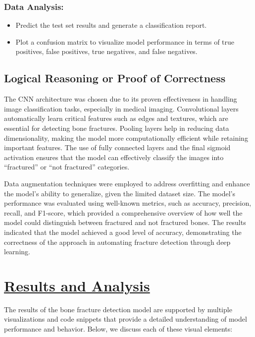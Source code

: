 \documentclass[11pt]{article}
\providecommand{\tightlist}{%
      \setlength{\itemsep}{0pt}\setlength{\parskip}{0pt}}
\begin{document}
\subsubsection*{Data Analysis:}\label{data-analysis}

\begin{itemize}
\tightlist
\item
  Predict the test set results and generate a classification report.
\item
  Plot a confusion matrix to visualize model performance in terms of
  true positives, false positives, true negatives, and false negatives.
\end{itemize}

\subsection*{ Logical Reasoning or Proof of
Correctness}\label{logical-reasoning-or-proof-of-correctness}

The CNN architecture was chosen due to its proven effectiveness in
handling image classification tasks, especially in medical imaging.
Convolutional layers automatically learn critical features such as edges
and textures, which are essential for detecting bone fractures. Pooling
layers help in reducing data dimensionality, making the model more
computationally efficient while retaining important features. The use of
fully connected layers and the final sigmoid activation ensures that the
model can effectively classify the images into ``fractured'' or ``not
fractured'' categories.

Data augmentation techniques were employed to address overfitting and
enhance the model's ability to generalize, given the limited dataset
size. The model's performance was evaluated using well-known metrics,
such as accuracy, precision, recall, and F1-score, which provided a
comprehensive overview of how well the model could distinguish between
fractured and not fractured bones. The results indicated that the model
achieved a good level of accuracy, demonstrating the correctness of the
approach in automating fracture detection through deep learning.

\section*{\Large\underline{\textbf{Results and Analysis}}}\label{references}

The results of the bone fracture detection model are supported by
multiple visualizations and code snippets that provide a detailed
understanding of model performance and behavior. Below, we discuss each
of these visual elements:
\end{document}
